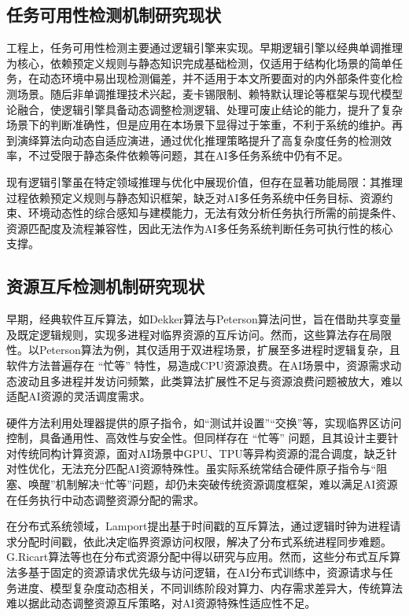 \subsection{任务可用性检测机制研究现状}

工程上，任务可用性检测主要通过逻辑引擎来实现。早期逻辑引擎以经典单调推理为核心\cite{liao2008defeasible}，依赖预定义规则与静态知识完成基础检测，仅适用于结构化场景的简单任务，在动态环境中易出现检测偏差，并不适用于本文所要面对的内外部条件变化检测场景。随后非单调推理技术兴起，麦卡锡限制\cite{mccarthy1980circumscription}、赖特默认理论\cite{reiter1980logic}等框架与现代模型论融合，使逻辑引擎具备动态调整检测逻辑、处理可废止结论的能力，提升了复杂场景下的判断准确性，但是应用在本场景下显得过于笨重，不利于系统的维护。再到演绎算法向动态自适应演进，通过优化推理策略提升了高复杂度任务的检测效率，不过受限于静态条件依赖等问题，其在AI多任务系统中仍有不足。

现有逻辑引擎虽在特定领域推理与优化中展现价值，但存在显著功能局限：其推理过程依赖预定义规则与静态知识框架，缺乏对AI多任务系统中任务目标、资源约束、环境动态性的综合感知与建模能力，无法有效分析任务执行所需的前提条件、资源匹配度及流程兼容性，因此无法作为AI多任务系统判断任务可执行性的核心支撑。

\subsection{资源互斥检测机制研究现状}

早期，经典软件互斥算法，如Dekker算法与Peterson算法问世，旨在借助共享变量及既定逻辑规则，实现多进程对临界资源的互斥访问。然而，这些算法存在局限性。以Peterson算法为例，其仅适用于双进程场景，扩展至多进程时逻辑复杂，且软件方法普遍存在 “忙等” 特性，易造成CPU资源浪费。在AI场景中，资源需求动态波动且多进程并发访问频繁，此类算法扩展性不足与资源浪费问题被放大，难以适配AI资源的灵活调度需求。

硬件方法\cite{bershad1992fast}利用处理器提供的原子指令，如“测试并设置”“交换”等，实现临界区访问控制，具备通用性、高效性与安全性。但同样存在 “忙等” 问题，且其设计主要针对传统同构计算资源，面对AI场景中GPU、TPU等异构资源的混合调度，缺乏针对性优化，无法充分匹配AI资源特殊性。虽实际系统常结合硬件原子指令与“阻塞、唤醒”机制解决“忙等”问题，却仍未突破传统资源调度框架，难以满足AI资源在任务执行中动态调整资源分配的需求。

在分布式系统领域，Lamport\cite{lamport2019time}提出基于时间戳的互斥算法，通过逻辑时钟为进程请求分配时间戳，依此决定临界资源访问权限，解决了分布式系统进程同步难题。G.Ricart\cite{ricart1981optimal}算法等也在分布式资源分配中得以研究与应用。然而，这些分布式互斥算法多基于固定的资源请求优先级与访问逻辑，在AI分布式训练中，资源请求与任务进度、模型复杂度动态相关，不同训练阶段对算力、内存需求差异大，传统算法难以据此动态调整资源互斥策略，对AI资源特殊性适应性不足。

